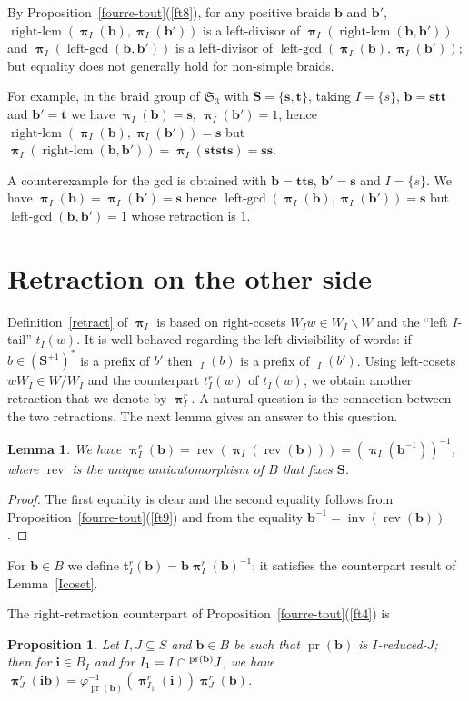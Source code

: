\documentclass{amsart}
\numberwithin{equation}{section}
\newtheorem{lemma}[equation]{Lemma}
\newtheorem{proposition}[equation]{Proposition}
\newcommand\lexp[2]{\kern\scriptspace\vphantom{#2}^{#1}\kern-\scriptspace#2}
\newcommand\inv{^{-1}}
\newcommand\bb{{\mathbf b}}
\newcommand\bi{{\mathbf i}}
\newcommand\bs{{\mathbf s}}
\newcommand\bt{{\mathbf t}}
\newcommand\bS{{\mathbf S}}
\DeclareMathOperator\rightlcm{right-lcm}
\DeclareMathOperator\leftgcd{left-gcd}
\DeclareMathOperator\inverse{inv}
\DeclareMathOperator\pr{pr}
\DeclareMathOperator\hpi{\hat\pi}
\DeclareMathOperator\bpi{\boldsymbol\pi}
\DeclareMathOperator\rev{rev}
\begin{document}
By Proposition~\ref{fourre-tout}(\ref{ft8}), for any positive braids $\bb$ and $\bb'$, 
$\rightlcm(\bpi_I(\bb),\bpi_I(\bb'))$ is a left-divisor of
$\bpi_I(\rightlcm(\bb,\bb'))$ and 
$\bpi_I(\leftgcd(\bb,\bb'))$  is a left-divisor of
$\leftgcd(\bpi_I(\bb),\bpi_I(\bb'))$;
but equality does not generally hold for non-simple braids.

For example, in the braid group of $\mathfrak S_3$
with $\bS=\{\bs,\bt\}$, taking $I=\{s\}$, $\bb=\bs\bt\bt$ and
$\bb'=\bt$ we have $\bpi_I(\bb)=\bs$, $\bpi_I(\bb')=1$, hence  
$\rightlcm(\bpi_I(\bb),\bpi_I(\bb'))=\bs$ but
$\bpi_I(\rightlcm(\bb,\bb'))=\bpi_I(\bs\bt\bs\bt\bs)=\bs\bs$.

A counterexample for the gcd is obtained with $\bb=\bt\bt\bs$, $\bb'=\bs$ and $I=\{s\}$.
We have $\bpi_I(\bb)=\bpi_I(\bb')=\bs$ hence $\leftgcd(\bpi_I(\bb),\bpi_I(\bb'))=\bs$
but $\leftgcd(\bb,\bb')=1$ whose retraction is $1$. 
\section{Retraction on the other side}\label{section3}
Definition~\ref{retract} of $\bpi_I$ is based on right-cosets $W_Iw\in
W_I\backslash W$ and the ``left $I$-tail'' $t_I(w)$. It
is well-behaved regarding the left-divisibility of words: if $b\in(\bS^{\pm 1})^*$ 
is a prefix of $b'$
then $\hpi_I(b)$ is a prefix of $\hpi_I(b')$.  Using left-cosets
$wW_I\in W/W_I$ and the counterpart  $t^r_I(w)$  of $t_I(w)$,
we obtain another retraction that we
denote by \index{pirI@$\bpi^r_I$} $\bpi^r_I$.  A natural
question is the connection between the two retractions. The next lemma gives an answer to this question.
\begin{lemma}\label{rightProj}
We have $\bpi^r_I(\bb)=\rev(\bpi_I(\rev(\bb))) =
(\bpi_I(\bb\inv))\inv$, where \index{rev@$\rev$} $\rev$ is the unique
antiautomorphism of $B$ that fixes $\bS$. 
\end{lemma}
\begin{proof}
The first equality is clear and the second equality
 follows from Proposition~\ref{fourre-tout}(\ref{ft9}) and from the equality
 $\bb\inv=\inverse(\rev(\bb))$.
\end{proof}


For $\bb\in B$ we define 
$\bt_I^r(\bb)  = \bb\bpi^r_I(\bb)\inv$; it satisfies the counterpart result of
Lemma~\ref{Icoset}.

The right-retraction counterpart of Proposition~\ref{fourre-tout}(\ref{ft4}) is
\begin{proposition}\label{counterpart}
Let $I,J\subseteq S$ and $\bb\in B$ be such that $\pr(\bb)$ is $I$-reduced-$J$;
then for $\bi\in B_I$ and for $I_1=I\cap \lexp{\pr(\bb)}J$, we have
$\bpi_J^r(\bi\bb)=\varphi\inv_{\pr(\bb)}(\bpi^r_{I_1}(\bi))\bpi_J^r(\bb)$.
\end{proposition}
\end{document}
